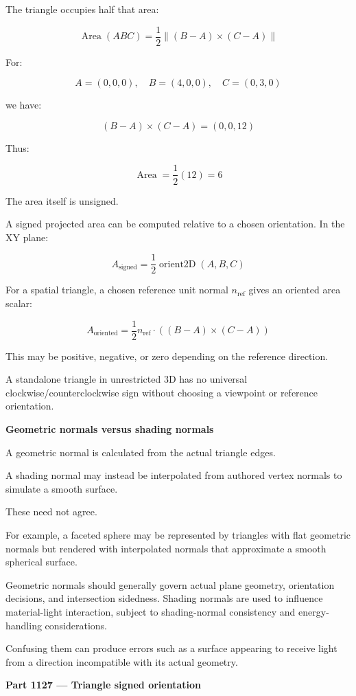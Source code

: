 The triangle occupies half that area:

\[
\boxed{ \operatorname{Area}(ABC)= \frac12\|(B-A)\times(C-A)\| }
\]

For:

\[
A=(0,0,0),\quad B=(4,0,0),\quad C=(0,3,0)
\]

we have:

\[
(B-A)\times(C-A)=(0,0,12)
\]

Thus:

\[
\operatorname{Area}=\frac12(12)=6
\]

The area itself is unsigned.

A signed projected area can be computed relative to a chosen orientation. In the XY plane:

\[
A_{\mathrm{signed}}= \frac12\operatorname{orient2D}(A,B,C)
\]

For a spatial triangle, a chosen reference unit normal \(n_{\mathrm{ref}}\) gives an oriented area scalar:

\[
A_{\mathrm{oriented}}= \frac12n_{\mathrm{ref}}\cdot ((B-A)\times(C-A))
\]

This may be positive, negative, or zero depending on the reference direction.

A standalone triangle in unrestricted 3D has no universal clockwise/counterclockwise sign without choosing a viewpoint or reference orientation.

\textbf{Geometric normals versus shading normals}

A geometric normal is calculated from the actual triangle edges.

A shading normal may instead be interpolated from authored vertex normals to simulate a smooth surface.

These need not agree.

For example, a faceted sphere may be represented by triangles with flat geometric normals but rendered with interpolated normals that approximate a smooth spherical surface.

Geometric normals should generally govern actual plane geometry, orientation decisions, and intersection sidedness. Shading normals are used to influence material-light interaction, subject to shading-normal consistency and energy-handling considerations.

Confusing them can produce errors such as a surface appearing to receive light from a direction incompatible with its actual geometry.

\textbf{Part 1127 --- Triangle signed orientation}

